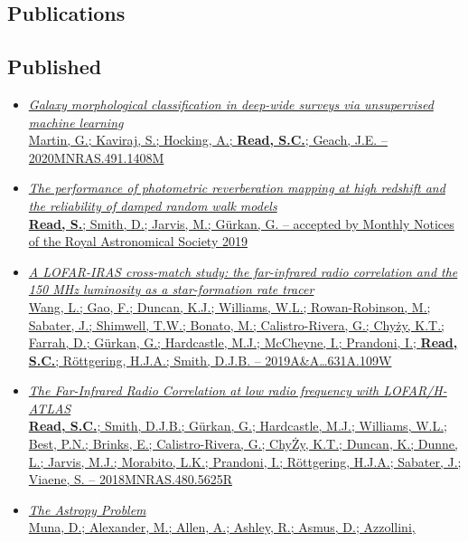 \documentclass[letterpaper]{twentysecondcv} %
\begin{document}
\begin{finalpages}
\section{Publications}
\subsection{Published}
\begin{itemize}
     \item \href{http://shaun.science/publication/2020-01-00-Galaxy-morphological-classification-in-deep-wide-surveys-via-unsupervised-machine-learning}{\textit{Galaxy morphological classification in deep-wide surveys via
unsupervised machine learning}\\{\small Martin, G.; Kaviraj, S.; Hocking, A.; \textbf{Read, S.C.}; Geach, J.E. -- 2020MNRAS.491.1408M}}
 \item \href{http://shaun.science/publication/2019-12-06-The-performance-of-photometric-reverberation-mapping-at-high-redshift-and-the-reliability-of-damped-random-walk-models}{\textit{The performance of photometric reverberation mapping at high redshift
and the reliability of damped random walk models}\\{\small \textbf{Read, S.}; Smith, D.; Jarvis, M.; Gürkan, G. -- accepted by Monthly Notices of the Royal Astronomical Society 2019}}
 \item \href{http://shaun.science/publication/2019-11-00-A-LOFAR-IRAS-cross-match-study}{\textit{A LOFAR-IRAS cross-match study: the far-infrared radio correlation and
the 150 MHz luminosity as a star-formation rate tracer}\\{\small Wang, L.; Gao, F.; Duncan, K.J.; Williams, W.L.; Rowan-Robinson, M.;
Sabater, J.; Shimwell, T.W.; Bonato, M.; Calistro-Rivera, G.; Chyży,
K.T.; Farrah, D.; Gürkan, G.; Hardcastle, M.J.; McCheyne, I.; Prandoni,
I.; \textbf{Read, S.C.}; Röttgering, H.J.A.; Smith, D.J.B. -- 2019A\&A\ldots631A.109W}}
 \item \href{http://shaun.science/publication/2018-11-00-The-Far-Infrared-Radio-Correlation-at-low-radio-frequency-with-LOFAR-H-ATLAS}{\textit{The Far-Infrared Radio Correlation at low radio frequency with
LOFAR/H-ATLAS}\\{\small \textbf{Read, S.C.}; Smith, D.J.B.; Gürkan, G.; Hardcastle, M.J.;
Williams, W.L.; Best, P.N.; Brinks, E.; Calistro-Rivera, G.; ChyŻy,
K.T.; Duncan, K.; Dunne, L.; Jarvis, M.J.; Morabito, L.K.; Prandoni, I.;
Röttgering, H.J.A.; Sabater, J.; Viaene, S. -- 2018MNRAS.480.5625R}}
 \item \href{http://shaun.science/publication/2016-10-00-The-Astropy-Problem}{\textit{The Astropy Problem}\\{\small Muna, D.; Alexander, M.; Allen, A.; Ashley, R.; Asmus, D.; Azzollini,
}}
\end{itemize}
\end{finalpages}
\end{document}
